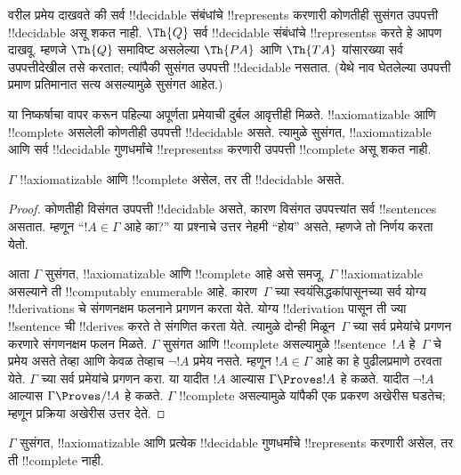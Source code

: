 \documentclass[../../../include/open-logic-section]{subfiles}
\begin{document}
\begin{explain}
वरील प्रमेय दाखवते की सर्व !!{decidable} संबंधांचे !!{represents}
करणारी कोणतीही सुसंगत उपपत्ती !!{decidable} असू शकत नाही.
$\Th{Q}$ सर्व !!{decidable} संबंधांचे !!{represents}s करते हे
आपण दाखवू. म्हणजे $\Th{Q}$ समाविष्ट असलेल्या $\Th{PA}$
आणि $\Th{TA}$ यांसारख्या सर्व उपपत्तीदेखील तसे करतात; त्यांपैकी
सुसंगत उपपत्ती !!{decidable} नसतात. (येथे नाव घेतलेल्या उपपत्ती
प्रमाण प्रतिमानात सत्य असल्यामुळे सुसंगत आहेत.)

या निष्कर्षाचा वापर करून पहिल्या अपूर्णता प्रमेयाची दुर्बल आवृत्तीही
मिळते. !!{axiomatizable} आणि !!{complete} असलेली कोणतीही
उपपत्ती !!{decidable} असते. त्यामुळे सुसंगत, !!{axiomatizable}
आणि सर्व !!{decidable} गुणधर्मांचे !!{represents}s करणारी उपपत्ती
!!{complete} असू शकत नाही.
\end{explain}

\begin{thm}
$\Gamma$ !!{axiomatizable} आणि !!{complete} असेल, तर ती
!!{decidable} असते.
\end{thm}

\begin{proof}
कोणतीही विसंगत उपपत्ती !!{decidable} असते, कारण विसंगत
उपपत्त्यांत सर्व !!{sentence}s असतात. म्हणून ``$!A \in
\Gamma$ आहे का?'' या प्रश्नाचे उत्तर नेहमी ``होय'' असते,
म्हणजे तो निर्णय करता येतो.

आता $\Gamma$ सुसंगत, !!{axiomatizable} आणि !!{complete} आहे
असे समजू. $\Gamma$ !!{axiomatizable} असल्याने ती
!!{computably enumerable} आहे. कारण~$\Gamma$ च्या
स्वयंसिद्धकांपासूनच्या सर्व योग्य !!{derivation}s चे संगणनक्षम
फलनाने प्रगणन करता येते. योग्य !!{derivation} पासून ती ज्या
!!{sentence} ची !!{derive}s करते ते संगणित करता येते. त्यामुळे
दोन्ही मिळून~$\Gamma$ च्या सर्व प्रमेयांचे प्रगणन करणारे
संगणनक्षम फलन मिळते. $\Gamma$ सुसंगत आणि !!{complete} असल्यामुळे
!!{sentence}~$!A$ हे~$\Gamma$ चे प्रमेय असते तेव्हा आणि केवळ तेव्हाच
$\lnot !A$ प्रमेय नसते. म्हणून $!A \in
\Gamma$ आहे का हे पुढीलप्रमाणे ठरवता येते. $\Gamma$ च्या सर्व
प्रमेयांचे प्रगणन करा. या यादीत $!A$ आल्यास $\Gamma \Proves !A$
हे कळते. यादीत $\lnot
!A$ आल्यास $\Gamma \Proves/ !A$ हे कळते. $\Gamma$
!!{complete} असल्यामुळे यांपैकी एक प्रकरण अखेरीस घडतेच;
म्हणून प्रक्रिया अखेरीस उत्तर देते.
\end{proof}

\begin{cor}
$\Gamma$ सुसंगत, !!{axiomatizable} आणि प्रत्येक !!{decidable}
गुणधर्मांचे !!{represents} करणारी असेल, तर ती !!{complete} नाही.
\end{cor}
\end{document}

